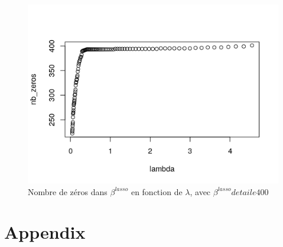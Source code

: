 \documentclass{article}
\begin{document}
	\begin{figure}[ht]
		\centering
		\caption{\label{nb_zeros_cval} Nombre de zéros dans $\beta^{lasso}$ en fonction de $\lambda$, avec $\beta^{lasso} de taile 400$}
		\includegraphics[scale=0.8]{nb_zeros_cval.png}
	\end{figure}

	
	
	
	\clearpage
	\newpage
	\section{Appendix}


	\inputminted[breaklines, linenos]{R}{main.R}
	
	
	
\end{document}
